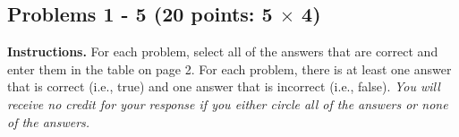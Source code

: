 \documentclass[letterpaper]{article}
\begin{document}
%
%
%

\newpage



\subsection*{Problems 1 - 5 {\rm (20 points: 5 $\times$ 4)}}

{\bf Instructions.} For each problem, select all of the answers that are correct and enter them in the table on page 2. For each problem, there is at least one answer that is correct (i.e., true) and one answer that is incorrect (i.e., false). \textit{You will receive no credit for your response if you either circle all of the answers or none of the answers.}

\vspace{0.5in}
\end{document}
